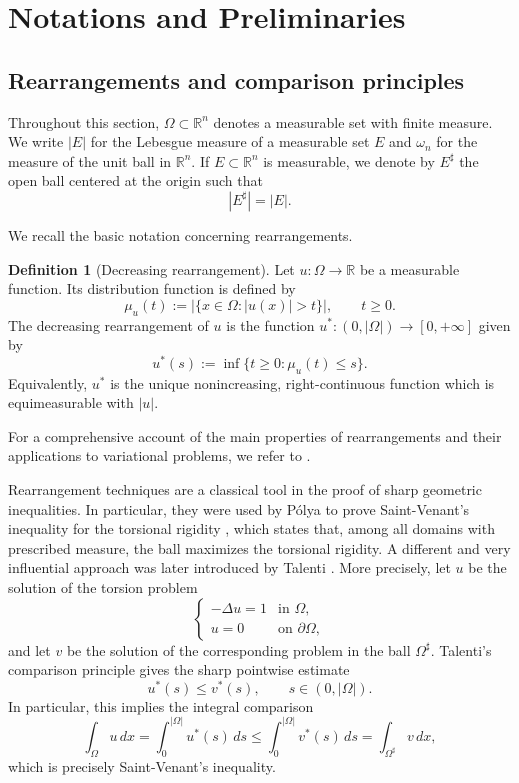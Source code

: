 \documentclass[oneside,a4paper,11pt,notitlepage]{article}
\newcommand{\abs}[1]{{\left|#1\right|}}
\theoremstyle{definition}
\newtheorem{definizione}{Definition}[section]
\theoremstyle{plain}
\theoremstyle{definition}
\begin{document}
\section{Notations and Preliminaries}\label{Notations}
\subsection{Rearrangements and comparison principles}

Throughout this section, $\Omega\subset\mathbb{R}^n$ denotes a measurable set with finite measure. We write $\abs{E}$ for the Lebesgue measure of a measurable set $E$ and $\omega_n$ for the measure of the unit ball in $\mathbb{R}^n$. If $E\subset\mathbb{R}^n$ is measurable, we denote by $E^\sharp$ the open ball centered at the origin such that
\[
    \abs{E^\sharp}=\abs{E}.
\]

We recall the basic notation concerning rearrangements. 

\begin{definizione}[Decreasing rearrangement]
Let $u:\Omega\to\mathbb{R}$ be a measurable function. Its distribution function is defined by
\[
    \mu_u(t):=\abs{\{x\in\Omega:\abs{u(x)}>t\}},\qquad t\geq 0.
\]
The decreasing rearrangement of $u$ is the function $u^\ast:(0,\abs{\Omega})\to[0,+\infty]$ given by
\[
    u^\ast(s):=\inf\{t\geq 0:\mu_u(t)\leq s\}.
\]
Equivalently, $u^\ast$ is the unique nonincreasing, right-continuous function which is equimeasurable with $\abs{u}$.
\end{definizione}

For a comprehensive account of the main properties of rearrangements and their applications to variational problems, we refer to \cite{K}.

Rearrangement techniques are a classical tool in the proof of sharp geometric inequalities. In particular, they were used by P\'olya to prove Saint-Venant's inequality for the torsional rigidity \cite{P}, which states that, among all domains with prescribed measure, the ball maximizes the torsional rigidity. A different and very influential approach was later introduced by Talenti \cite{T}. More precisely, let $u$ be the solution of the torsion problem
\[
    \begin{cases}
        -\Delta u=1 & \text{in }\Omega,\\
        u=0 & \text{on }\partial\Omega,
    \end{cases}
\]
and let $v$ be the solution of the corresponding problem in the ball $\Omega^\sharp$. Talenti's comparison principle gives the sharp pointwise estimate
\[
    u^\ast(s)\leq v^\ast(s),\qquad s\in(0,\abs{\Omega}).
\]
In particular, this implies the integral comparison
\[
    \int_\Omega u\,dx=\int_0^{\abs{\Omega}}u^\ast(s)\,ds\leq\int_0^{\abs{\Omega}}v^\ast(s)\,ds=\int_{\Omega^\sharp}v\,dx,
\]
which is precisely Saint-Venant's inequality.
\end{document}
